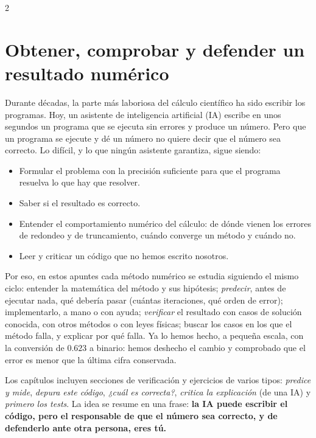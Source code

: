 \begin{paracol}{2}
\section{Obtener, comprobar y defender un resultado numérico}\label{sec:intro_verificar}
Durante décadas, la parte más laboriosa del cálculo científico ha sido escribir los programas. Hoy, un asistente de inteligencia artificial (IA) escribe en unos segundos un programa que se ejecuta sin errores y produce un número. Pero que un programa se ejecute y dé un número no quiere decir que el número sea correcto. Lo difícil, y lo que ningún asistente garantiza, sigue siendo:
\begin{itemize}
\item Formular el problema con la precisión suficiente para que el programa resuelva lo que hay que resolver.
\item Saber si el resultado es correcto.
\item Entender el comportamiento numérico del cálculo: de dónde vienen los errores de redondeo y de truncamiento, cuándo converge un método y cuándo no.
\item Leer y criticar un código que no hemos escrito nosotros.
\end{itemize}
Por eso, en estos apuntes cada método numérico se estudia siguiendo el mismo ciclo: entender la matemática del método y sus hipótesis; \emph{predecir}, antes de ejecutar nada, qué debería pasar (cuántas iteraciones, qué orden de error); implementarlo, a mano o con ayuda; \emph{verificar} el resultado con casos de solución conocida, con otros métodos o con leyes físicas; buscar los casos en los que el método falla, y explicar por qué falla. Ya lo hemos hecho, a pequeña escala, con la conversión de $0.623$ a binario: hemos deshecho el cambio y comprobado que el error es menor que la última cifra conservada.

Los capítulos incluyen secciones de verificación y ejercicios de varios tipos: \emph{predice y mide}, \emph{depura este código}, \emph{¿cuál es correcta?}, \emph{critica la explicación} (de una IA) y \emph{primero los tests}. La idea se resume en una frase: \textbf{la IA puede escribir el código, pero el responsable de que el número sea correcto, y de defenderlo ante otra persona, eres tú.}
\switchcolumn

\end{paracol}
